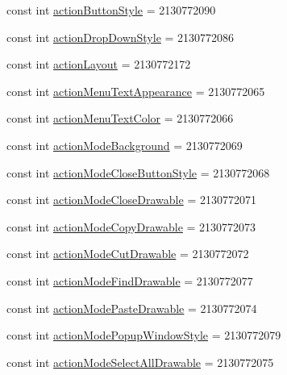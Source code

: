\begin{CompactItemize}
\item 
const int \hyperlink{class__2doo_1_1_droid_1_1_resource_1_1_attribute_7fe0f4abe6c2b781520b593c28ac70a6}{actionButtonStyle} = 2130772090
\item 
const int \hyperlink{class__2doo_1_1_droid_1_1_resource_1_1_attribute_23be8af7900df23ff2d0ebbf5905200e}{actionDropDownStyle} = 2130772086
\item 
const int \hyperlink{class__2doo_1_1_droid_1_1_resource_1_1_attribute_d430df0043ea8a6982190472aa047250}{actionLayout} = 2130772172
\item 
const int \hyperlink{class__2doo_1_1_droid_1_1_resource_1_1_attribute_147ad75ca441f29ba2d5044643714d96}{actionMenuTextAppearance} = 2130772065
\item 
const int \hyperlink{class__2doo_1_1_droid_1_1_resource_1_1_attribute_d758e2c4517817539ba366ddede1b34f}{actionMenuTextColor} = 2130772066
\item 
const int \hyperlink{class__2doo_1_1_droid_1_1_resource_1_1_attribute_919f672914d063f67e09490b0b981901}{actionModeBackground} = 2130772069
\item 
const int \hyperlink{class__2doo_1_1_droid_1_1_resource_1_1_attribute_b9afc7f1a6438da768dbe4726dec02e6}{actionModeCloseButtonStyle} = 2130772068
\item 
const int \hyperlink{class__2doo_1_1_droid_1_1_resource_1_1_attribute_9564a273735fb79e7e948b907916ab56}{actionModeCloseDrawable} = 2130772071
\item 
const int \hyperlink{class__2doo_1_1_droid_1_1_resource_1_1_attribute_0b88e47b4811d42e3242616fc01c0304}{actionModeCopyDrawable} = 2130772073
\item 
const int \hyperlink{class__2doo_1_1_droid_1_1_resource_1_1_attribute_83463c8999341aef60a1af73e0e0e0eb}{actionModeCutDrawable} = 2130772072
\item 
const int \hyperlink{class__2doo_1_1_droid_1_1_resource_1_1_attribute_470e56ec860d59acb1ab753c52a94ecb}{actionModeFindDrawable} = 2130772077
\item 
const int \hyperlink{class__2doo_1_1_droid_1_1_resource_1_1_attribute_c08711a90b2eda03f8145f658a5affec}{actionModePasteDrawable} = 2130772074
\item 
const int \hyperlink{class__2doo_1_1_droid_1_1_resource_1_1_attribute_427be43de182d6767502c2427a07cc7c}{actionModePopupWindowStyle} = 2130772079
\item 
const int \hyperlink{class__2doo_1_1_droid_1_1_resource_1_1_attribute_a1a4e7156acb5f9de0439464a348a9a0}{actionModeSelectAllDrawable} = 2130772075

\end{CompactItemize}
